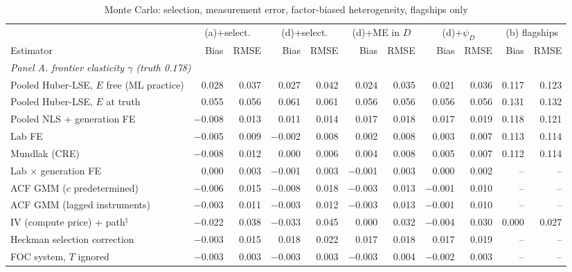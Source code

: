 \begin{table}[!htbp]
\centering
\begin{threeparttable}
\caption{Monte Carlo: selection, measurement error, factor-biased heterogeneity, flagships only}
\label{tab:mc_industry_variants}
\footnotesize
\begin{tabular}{lrrrrrrrrrr}
\toprule
 & \multicolumn{2}{c}{(a)+select.} & \multicolumn{2}{c}{(d)+select.} & \multicolumn{2}{c}{(d)+ME in $D$} & \multicolumn{2}{c}{(d)+$\psi_D$} & \multicolumn{2}{c}{(b) flagships} \\
\cmidrule(lr){2-3} \cmidrule(lr){4-5} \cmidrule(lr){6-7} \cmidrule(lr){8-9} \cmidrule(lr){10-11}
Estimator & Bias & RMSE & Bias & RMSE & Bias & RMSE & Bias & RMSE & Bias & RMSE \\
\midrule
\multicolumn{11}{l}{\textit{Panel A. frontier elasticity $\gamma$ (truth 0.178)}} \\
Pooled Huber-LSE, $E$ free (ML practice) & 0.028 & 0.037 & 0.027 & 0.042 & 0.024 & 0.035 & 0.021 & 0.036 & 0.117 & 0.123 \\
Pooled Huber-LSE, $E$ at truth & 0.055 & 0.056 & 0.061 & 0.061 & 0.056 & 0.056 & 0.056 & 0.056 & 0.131 & 0.132 \\
Pooled NLS + generation FE & $-$0.008 & 0.013 & 0.011 & 0.014 & 0.017 & 0.018 & 0.017 & 0.019 & 0.118 & 0.121 \\
Lab FE & $-$0.005 & 0.009 & $-$0.002 & 0.008 & 0.002 & 0.008 & 0.003 & 0.007 & 0.113 & 0.114 \\
Mundlak (CRE) & $-$0.008 & 0.012 & 0.000 & 0.006 & 0.004 & 0.008 & 0.005 & 0.007 & 0.112 & 0.114 \\
Lab $\times$ generation FE & 0.000 & 0.003 & $-$0.001 & 0.003 & $-$0.001 & 0.003 & 0.000 & 0.002 & -- & -- \\
ACF GMM ($c$ predetermined) & $-$0.006 & 0.015 & $-$0.008 & 0.018 & $-$0.003 & 0.013 & $-$0.001 & 0.010 & -- & -- \\
ACF GMM (lagged instruments) & $-$0.003 & 0.011 & $-$0.003 & 0.012 & $-$0.003 & 0.013 & $-$0.001 & 0.010 & -- & -- \\
IV (compute price) + path$^{\ddagger}$ & $-$0.022 & 0.038 & $-$0.033 & 0.045 & 0.000 & 0.032 & $-$0.004 & 0.030 & 0.000 & 0.027 \\
Heckman selection correction & $-$0.003 & 0.015 & 0.018 & 0.022 & 0.017 & 0.018 & 0.017 & 0.019 & -- & -- \\
FOC system, $T$ ignored & $-$0.003 & 0.003 & $-$0.003 & 0.003 & $-$0.003 & 0.004 & $-$0.002 & 0.003 & -- & -- \\

\end{tabular}
\end{threeparttable}
\end{table}
